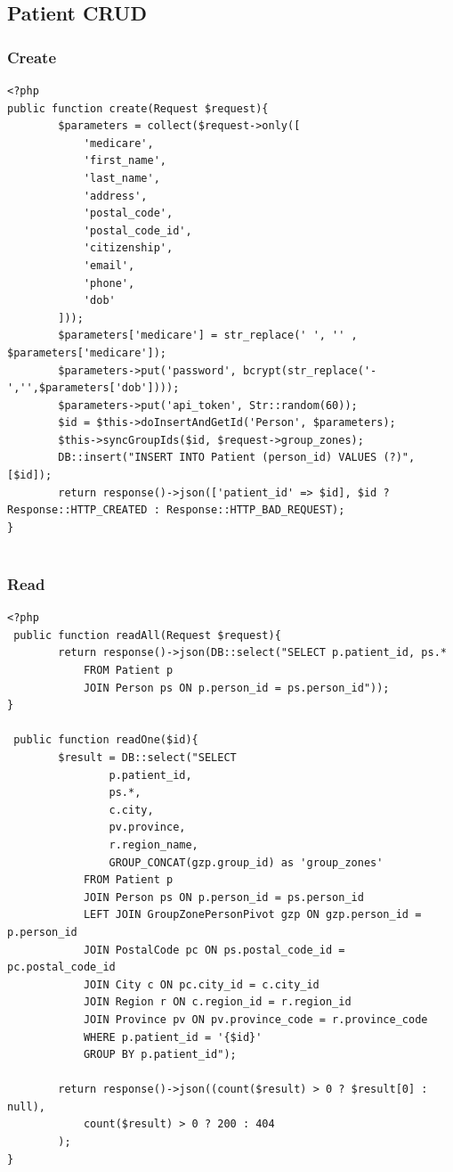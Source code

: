 \subsection{Patient CRUD}
\subsubsection{Create}
\begin{verbatim}
<?php
public function create(Request $request){
        $parameters = collect($request->only([
            'medicare',
            'first_name',
            'last_name',
            'address',
            'postal_code',
            'postal_code_id',
            'citizenship',
            'email',
            'phone',
            'dob'
        ]));
        $parameters['medicare'] = str_replace(' ', '' , $parameters['medicare']);
        $parameters->put('password', bcrypt(str_replace('-','',$parameters['dob'])));
        $parameters->put('api_token', Str::random(60));
        $id = $this->doInsertAndGetId('Person', $parameters);
        $this->syncGroupIds($id, $request->group_zones);
        DB::insert("INSERT INTO Patient (person_id) VALUES (?)", [$id]);
        return response()->json(['patient_id' => $id], $id ? Response::HTTP_CREATED : Response::HTTP_BAD_REQUEST);
}
    
\end{verbatim}
\subsubsection{Read}
\begin{verbatim}
<?php
 public function readAll(Request $request){
        return response()->json(DB::select("SELECT p.patient_id, ps.*
            FROM Patient p
            JOIN Person ps ON p.person_id = ps.person_id"));
}

 public function readOne($id){
        $result = DB::select("SELECT
                p.patient_id,
                ps.*,
                c.city,
                pv.province,
                r.region_name,
                GROUP_CONCAT(gzp.group_id) as 'group_zones'
            FROM Patient p
            JOIN Person ps ON p.person_id = ps.person_id
            LEFT JOIN GroupZonePersonPivot gzp ON gzp.person_id = p.person_id
            JOIN PostalCode pc ON ps.postal_code_id = pc.postal_code_id
            JOIN City c ON pc.city_id = c.city_id
            JOIN Region r ON c.region_id = r.region_id
            JOIN Province pv ON pv.province_code = r.province_code
            WHERE p.patient_id = '{$id}'
            GROUP BY p.patient_id");

        return response()->json((count($result) > 0 ? $result[0] : null),
            count($result) > 0 ? 200 : 404
        );
}

\end{verbatim}


